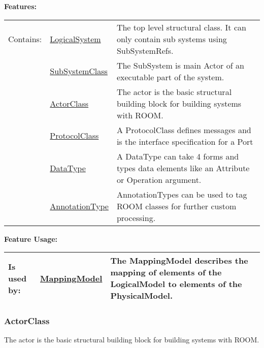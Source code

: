 		
	\begingroup
	\textbf{Features:}
	\renewcommand{\arraystretch}{1.8} %
	\begin{longtable}{l|l p{}}
		\hline
	Contains: & \tabitem \hyperlink{ref:LogicalSystem}{LogicalSystem}  & The top level structural class. It can only contain sub systems using SubSystemRefs.\\
	& \tabitem \hyperlink{ref:SubSystemClass}{SubSystemClass}  & The SubSystem is main Actor of an executable part of the system.  \\
	& \tabitem \hyperlink{ref:ActorClass}{ActorClass}  & The actor is the basic structural building block for building systems with ROOM. \\
	& \tabitem \hyperlink{ref:ProtocolClass}{ProtocolClass}  & A ProtocolClass defines messages and is the interface specification for a Port \\
	& \tabitem \hyperlink{ref:DataType}{DataType}  & A DataType can take 4 forms and types data elements like an Attribute or Operation argument. \\
	& \tabitem \hyperlink{ref:AnnotationType}{AnnotationType}  & AnnotationTypes can be used to tag ROOM classes for further custom processing. \\
	\hline
	\end{longtable}
	\endgroup
		
	\begingroup
	\textbf{Feature Usage:}
	\renewcommand{\arraystretch}{1.8} %
	\begin{longtable}{l|l p{}}
		\hline
	Is used by: & \tabitem \hyperlink{ref:MappingModel}{MappingModel}  & The MappingModel describes the mapping of elements of the LogicalModel to elements of the PhysicalModel.\\
	\hline
	\end{longtable}
	\endgroup
		
	
	\vspace{\baselineskip}
	\vspace{\baselineskip}
	\vspace{\baselineskip}
	
\subsubsection{ActorClass}
	\hypertarget{ref:ActorClass}{}
	The actor is the basic structural building block for building systems with ROOM.
		
